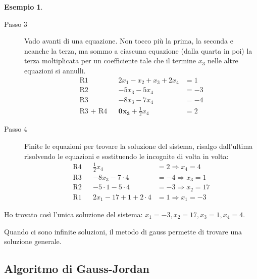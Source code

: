 \documentclass[a4paper]{article}
\theoremstyle{definition}
\newtheorem*{es}{Esempio}
\begin{document}
\begin{es}
\begin{description}
			\item[Passo 3] Vado avanti di una equazione. Non tocco più la prima, la seconda e neanche la terza, ma sommo a ciascuna equazione (dalla quarta in poi) la terza moltiplicata per un coefficiente tale che il termine $x_3$ nelle altre equazioni si annulli.
				  \begin{align*}
					  \text{R1}      &  & 2x_1 - x_2 + x_3 + 2x_4        & = 1   \\
					  \text{R2}      &  & - 5x_3 - 5x_4                  & = -3  \\
					  \text{R3}      &  & - 8x_3 - 7x_4                  & = - 4 \\
					  \text{R3 + R4} &  & \mathbf{0x_3} + \frac{1}{2}x_4 & = 2
				  \end{align*}
			\item[Passo 4] Finite le equazioni per trovare la soluzione del sistema, risalgo dall'ultima risolvendo le equazioni e sostituendo le incognite di volta in volta:
				  \begin{align*}
					  \text{R4} &  & \frac{1}{2}x_4            & = 2 \Rightarrow x_4 = 4   \\
					  \text{R3} &  & - 8x_3 - 7 \cdot 4        & = -4 \Rightarrow x_3 = 1  \\
					  \text{R2} &  & - 5 \cdot 1 - 5 \cdot 4   & = -3 \Rightarrow x_2 = 17 \\
					  \text{R1} &  & 2x_1 - 17 + 1 + 2 \cdot 4 & = 1 \Rightarrow x_1 = - 3
				\, \end{align*}
		\end{description}
		Ho trovato così l'unica soluzione del sistema: $x_1 = -3, x_2 = 17, x_3 = 1, x_4 = 4$.
	\end{es}
	Quando ci sono infinite soluzioni, il metodo di gauss permette di trovare una soluzione generale.
	
\subsection{Algoritmo di Gauss-Jordan}
\end{document}
